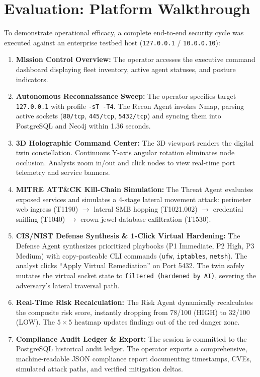 \documentclass[conference]{IEEEtran}
\begin{document}
\section{Evaluation: Platform Walkthrough}
To demonstrate operational efficacy, a complete end-to-end security cycle was executed against an enterprise testbed host (\texttt{127.0.0.1} / \texttt{10.0.0.10}):
\begin{enumerate}
    \item \textbf{Mission Control Overview:} The operator accesses the executive command dashboard displaying fleet inventory, active agent statuses, and posture indicators.
    \item \textbf{Autonomous Reconnaissance Sweep:} The operator specifies target \texttt{127.0.0.1} with profile \texttt{-sT -T4}. The Recon Agent invokes Nmap, parsing active sockets (\texttt{80/tcp}, \texttt{445/tcp}, \texttt{5432/tcp}) and syncing them into PostgreSQL and Neo4j within 1.36 seconds.
    \item \textbf{3D Holographic Command Center:} The 3D viewport renders the digital twin constellation. Continuous Y-axis angular rotation eliminates node occlusion. Analysts zoom in/out and click nodes to view real-time port telemetry and service banners.
    \item \textbf{MITRE ATT\&CK Kill-Chain Simulation:} The Threat Agent evaluates exposed services and simulates a 4-stage lateral movement attack: perimeter web ingress (T1190) $\to$ lateral SMB hopping (T1021.002) $\to$ credential sniffing (T1040) $\to$ crown jewel database exfiltration (T1530).
    \item \textbf{CIS/NIST Defense Synthesis \& 1-Click Virtual Hardening:} The Defense Agent synthesizes prioritized playbooks (P1 Immediate, P2 High, P3 Medium) with copy-pasteable CLI commands (\texttt{ufw}, \texttt{iptables}, \texttt{netsh}). The analyst clicks ``Apply Virtual Remediation'' on Port 5432. The twin safely mutates the virtual socket state to \texttt{filtered (hardened by AI)}, severing the adversary's lateral traversal path.
    \item \textbf{Real-Time Risk Recalculation:} The Risk Agent dynamically recalculates the composite risk score, instantly dropping from 78/100 (HIGH) to 32/100 (LOW). The $5 \times 5$ heatmap updates findings out of the red danger zone.
    \item \textbf{Compliance Audit Ledger \& Export:} The session is committed to the PostgreSQL historical audit ledger. The operator exports a comprehensive, machine-readable JSON compliance report documenting timestamps, CVEs, simulated attack paths, and verified mitigation deltas.
\end{enumerate}
\end{document}

